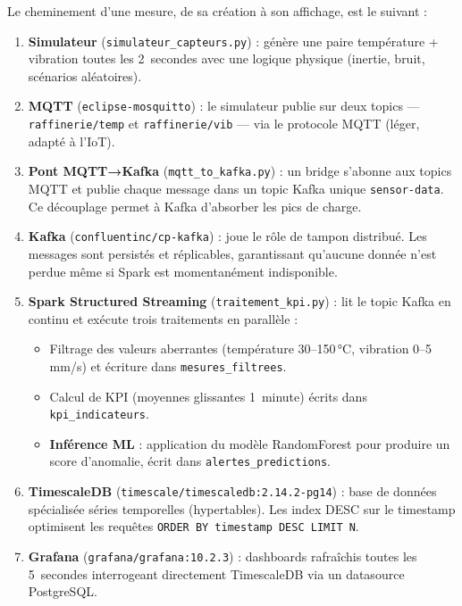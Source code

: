 \documentclass[12pt,a4paper]{article}
\begin{document}
Le cheminement d'une mesure, de sa création à son affichage, est le suivant :

\begin{enumerate}
    \item \textbf{Simulateur} (\texttt{simulateur\_capteurs.py}) : génère une paire température + vibration toutes les 2~secondes avec une logique physique (inertie, bruit, scénarios aléatoires).

    \item \textbf{MQTT} (\texttt{eclipse-mosquitto}) : le simulateur publie sur deux topics --- \texttt{raffinerie/temp} et \texttt{raffinerie/vib} --- via le protocole MQTT (léger, adapté à l'IoT).

    \item \textbf{Pont MQTT→Kafka} (\texttt{mqtt\_to\_kafka.py}) : un bridge s'abonne aux topics MQTT et publie chaque message dans un topic Kafka unique \texttt{sensor-data}. Ce découplage permet à Kafka d'absorber les pics de charge.

    \item \textbf{Kafka} (\texttt{confluentinc/cp-kafka}) : joue le rôle de tampon distribué. Les messages sont persistés et réplicables, garantissant qu'aucune donnée n'est perdue même si Spark est momentanément indisponible.

    \item \textbf{Spark Structured Streaming} (\texttt{traitement\_kpi.py}) : lit le topic Kafka en continu et exécute trois traitements en parallèle :
    \begin{itemize}
        \item Filtrage des valeurs aberrantes (température 30--150\,°C, vibration 0--5\,mm/s) et écriture dans \texttt{mesures\_filtrees}.
        \item Calcul de KPI (moyennes glissantes 1~minute) écrits dans \texttt{kpi\_indicateurs}.
        \item \textbf{Inférence ML} : application du modèle RandomForest pour produire un score d'anomalie, écrit dans \texttt{alertes\_predictions}.
    \end{itemize}

    \item \textbf{TimescaleDB} (\texttt{timescale/timescaledb:2.14.2-pg14}) : base de données spécialisée séries temporelles (hypertables). Les index DESC sur le timestamp optimisent les requêtes \texttt{ORDER BY timestamp DESC LIMIT N}.

    \item \textbf{Grafana} (\texttt{grafana/grafana:10.2.3}) : dashboards rafraîchis toutes les 5~secondes interrogeant directement TimescaleDB via un datasource PostgreSQL.
\end{enumerate}
\end{document}
